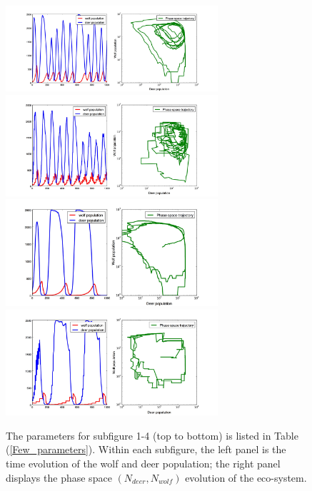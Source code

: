 \documentclass[a4paper,12pt]{article}
\begin{document}
\begin{figure}[htbp]
\begin{center}
\includegraphics[width=0.7\textwidth]{./pics/gen-5-10-15-uniform.jpeg}
\includegraphics[width=0.7\textwidth]{./pics/gen-5-10-15-delta.jpeg}
\includegraphics[width=0.7\textwidth]{./pics/gen-10-30-50-uniform.jpeg}
\includegraphics[width=0.7\textwidth]{./pics/gen-10-30-50-delta.jpeg}
\caption{The parameters for subfigure 1-4 (top to bottom) is listed in Table (\ref{Few_parameters}). Within each subfigure, the left panel is the time evolution of the wolf and deer population; the right panel displays the phase space $(N_{deer}, N_{wolf})$ evolution of the eco-system.}
\label{gen}
\end{center}
\end{figure}
\end{document}
